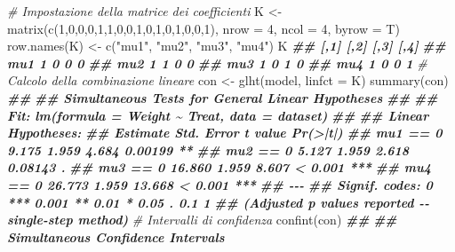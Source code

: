 \documentclass[
  12pt,
]{book}
\newenvironment{Shaded}{\begin{snugshade}}{\end{snugshade}}
\newcommand{\AttributeTok}[1]{\textcolor[rgb]{0.77,0.63,0.00}{#1}}
\newcommand{\CommentTok}[1]{\textcolor[rgb]{0.56,0.35,0.01}{\textit{#1}}}
\newcommand{\DecValTok}[1]{\textcolor[rgb]{0.00,0.00,0.81}{#1}}
\newcommand{\DocumentationTok}[1]{\textcolor[rgb]{0.56,0.35,0.01}{\textbf{\textit{#1}}}}
\newcommand{\FunctionTok}[1]{\textcolor[rgb]{0.00,0.00,0.00}{#1}}
\newcommand{\NormalTok}[1]{#1}
\newcommand{\OtherTok}[1]{\textcolor[rgb]{0.56,0.35,0.01}{#1}}
\newcommand{\StringTok}[1]{\textcolor[rgb]{0.31,0.60,0.02}{#1}}
\begin{document}
\begin{Shaded}
\begin{Highlighting}[]
\CommentTok{\# Impostazione della matrice dei coefficienti}
\NormalTok{K }\OtherTok{\textless{}{-}} \FunctionTok{matrix}\NormalTok{(}\FunctionTok{c}\NormalTok{(}\DecValTok{1}\NormalTok{,}\DecValTok{0}\NormalTok{,}\DecValTok{0}\NormalTok{,}\DecValTok{0}\NormalTok{,}\DecValTok{1}\NormalTok{,}\DecValTok{1}\NormalTok{,}\DecValTok{0}\NormalTok{,}\DecValTok{0}\NormalTok{,}\DecValTok{1}\NormalTok{,}\DecValTok{0}\NormalTok{,}\DecValTok{1}\NormalTok{,}\DecValTok{0}\NormalTok{,}\DecValTok{1}\NormalTok{,}\DecValTok{0}\NormalTok{,}\DecValTok{0}\NormalTok{,}\DecValTok{1}\NormalTok{),}
\AttributeTok{nrow =} \DecValTok{4}\NormalTok{, }\AttributeTok{ncol =} \DecValTok{4}\NormalTok{, }\AttributeTok{byrow =}\NormalTok{ T)}
\FunctionTok{row.names}\NormalTok{(K) }\OtherTok{\textless{}{-}} \FunctionTok{c}\NormalTok{(}\StringTok{"mu1"}\NormalTok{, }\StringTok{"mu2"}\NormalTok{, }\StringTok{"mu3"}\NormalTok{, }\StringTok{"mu4"}\NormalTok{)}
\NormalTok{K}
\DocumentationTok{\#\#     [,1] [,2] [,3] [,4]}
\DocumentationTok{\#\# mu1    1    0    0    0}
\DocumentationTok{\#\# mu2    1    1    0    0}
\DocumentationTok{\#\# mu3    1    0    1    0}
\DocumentationTok{\#\# mu4    1    0    0    1}
\CommentTok{\# Calcolo della combinazione lineare}
\NormalTok{con }\OtherTok{\textless{}{-}} \FunctionTok{glht}\NormalTok{(model, }\AttributeTok{linfct =}\NormalTok{ K)}
\FunctionTok{summary}\NormalTok{(con)}
\DocumentationTok{\#\# }
\DocumentationTok{\#\#   Simultaneous Tests for General Linear Hypotheses}
\DocumentationTok{\#\# }
\DocumentationTok{\#\# Fit: lm(formula = Weight \textasciitilde{} Treat, data = dataset)}
\DocumentationTok{\#\# }
\DocumentationTok{\#\# Linear Hypotheses:}
\DocumentationTok{\#\#          Estimate Std. Error t value Pr(\textgreater{}|t|)    }
\DocumentationTok{\#\# mu1 == 0    9.175      1.959   4.684  0.00199 ** }
\DocumentationTok{\#\# mu2 == 0    5.127      1.959   2.618  0.08143 .  }
\DocumentationTok{\#\# mu3 == 0   16.860      1.959   8.607  \textless{} 0.001 ***}
\DocumentationTok{\#\# mu4 == 0   26.773      1.959  13.668  \textless{} 0.001 ***}
\DocumentationTok{\#\# {-}{-}{-}}
\DocumentationTok{\#\# Signif. codes:  0 \textquotesingle{}***\textquotesingle{} 0.001 \textquotesingle{}**\textquotesingle{} 0.01 \textquotesingle{}*\textquotesingle{} 0.05 \textquotesingle{}.\textquotesingle{} 0.1 \textquotesingle{} \textquotesingle{} 1}
\DocumentationTok{\#\# (Adjusted p values reported {-}{-} single{-}step method)}
\CommentTok{\# Intervalli di confidenza}
\FunctionTok{confint}\NormalTok{(con)}
\DocumentationTok{\#\# }
\DocumentationTok{\#\#   Simultaneous Confidence Intervals}

\end{Highlighting}
\end{Shaded}
\end{document}
